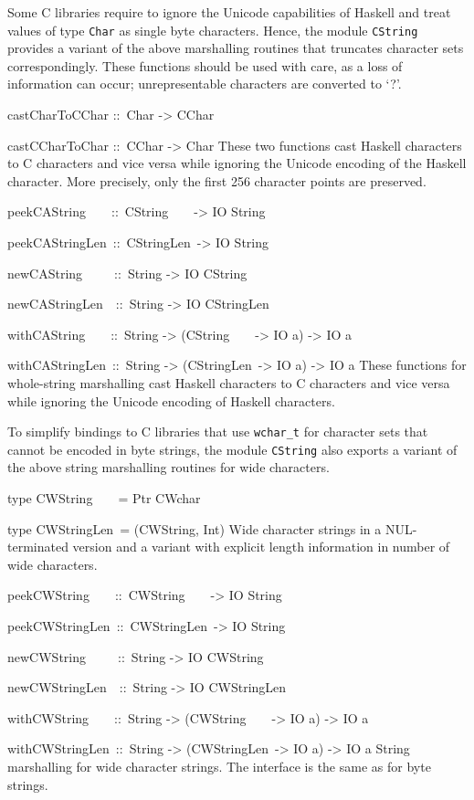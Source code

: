 \documentclass[a4paper,twoside]{article}
\makeatletter
\newcommand{\code}[1]{\texttt{#1}}      %
\newenvironment{codedesc}{%
  \list{}{\labelwidth\z@
    \let\makelabel\codedesclabel}
  }{%
  \endlist
  }
\newcommand*{\codedesclabel}[1]{%
  \hspace{-\leftmargin}
  \parbox[b]{\labelwidth}{\makebox[0pt][l]{\code{#1}}\\}\hfil\relax
  }
\newcommand{\combineitems}{\vspace*{-\itemsep}\vspace*{-\parsep}\vspace*{-1em}}
\makeatother
\begin{document}
Some C libraries require to ignore the Unicode capabilities of Haskell and
treat values of type \code{Char} as single byte characters.  Hence, the module
\code{CString} provides a variant of the above marshalling routines that
truncates character sets correspondingly.  These functions should be used with
care, as a loss of information can occur; unrepresentable characters are
converted to `?'.
%
\begin{codedesc}
\item[castCharToCChar ::\ Char -> CChar]
\item[castCCharToChar ::\ CChar -> Char] \combineitems These two functions cast
  Haskell characters to C characters and vice versa while ignoring the Unicode
  encoding of the Haskell character.  More precisely, only the first 256
  character points are preserved.

\item[peekCAString~~~~::\ CString~~~~-> IO String]
\item[peekCAStringLen~::\ CStringLen~-> IO String]\combineitems
\item[newCAString~~~~~::\ String -> IO CString]\combineitems
\item[newCAStringLen~~::\ String -> IO CStringLen] \combineitems
\item[withCAString~~~~::\ String -> (CString~~~~-> IO a) -> IO a]\combineitems
\item[withCAStringLen~::\ String -> (CStringLen~-> IO a) -> IO a]
  \combineitems These functions for whole-string marshalling cast Haskell
  characters to C characters and vice versa while ignoring the Unicode
  encoding of Haskell characters.
\end{codedesc}

To simplify bindings to C libraries that use \code{wchar\_t} for character
sets that cannot be encoded in byte strings, the module \code{CString} also
exports a variant of the above string marshalling routines for wide characters.
%
\begin{codedesc}
\item[type CWString~~~~= Ptr CWchar]
\item[type CWStringLen~= (CWString, Int)] \combineitems
  Wide character strings in a NUL-terminated version and a variant with
  explicit length information in number of wide characters.

\item[peekCWString~~~~::\ CWString~~~~-> IO String]
\item[peekCWStringLen~::\ CWStringLen~-> IO String]\combineitems
\item[newCWString~~~~~::\ String -> IO CWString]\combineitems
\item[newCWStringLen~~::\ String -> IO CWStringLen] \combineitems
\item[withCWString~~~~::\ String -> (CWString~~~~-> IO a) -> IO a]\combineitems
\item[withCWStringLen~::\ String -> (CWStringLen~-> IO a) -> IO a]
  \combineitems String marshalling for wide character strings.  The interface
  is the same as for byte strings.
\end{codedesc}
\end{document}
